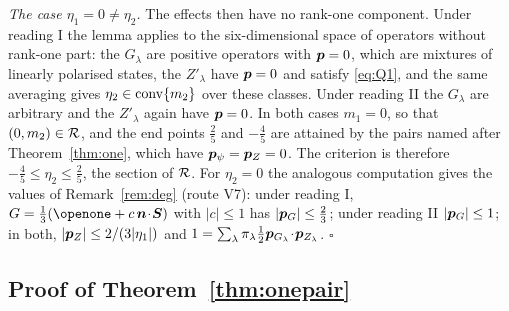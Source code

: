 \emph{The case $\eta_1=0\ne\eta_2$.} The effects then have no rank-one component. Under reading I the lemma applies to the six-dimensional space of operators without rank-one part: the $G_\lambda$ are positive operators with $\bm{p}=0$, which are mixtures of linearly polarised states, the $Z'_\lambda$ have $\bm{p}=0$ and satisfy \eqref{eq:Q1}, and the same averaging gives $\eta_2\in\operatorname{conv}\{m_2\}$ over these classes. Under reading II the $G_\lambda$ are arbitrary and the $Z'_\lambda$ again have $\bm{p}=0$. In both cases $m_1=0$, so that $(0,m_2)\in\mathcal{R}$, and the end points $\tfrac25$ and $-\tfrac45$ are attained by the pairs named after Theorem~\ref{thm:one}, which have $\bm{p}_\psi=\bm{p}_Z=0$. The criterion is therefore $-\tfrac45\le\eta_2\le\tfrac25$, the section of $\mathcal{R}$. For $\eta_2=0$ the analogous computation gives the values of Remark~\ref{rem:deg} (route V7): under reading I, $G=\tfrac13(\openone+c\,\bn\!\cdot\!\bS)$ with $|c|\le1$ has $|\bm{p}_G|\le\tfrac23$; under reading II $|\bm{p}_G|\le1$; in both, $|\bm{p}_Z|\le2/(3|\eta_1|)$ and $1=\sum_\lambda\pi_\lambda\tfrac12\bm{p}_{G_\lambda}\!\cdot\!\bm{p}_{Z_\lambda}$. \hfill$\square$

\subsection{Proof of Theorem~\ref{thm:onepair}}

